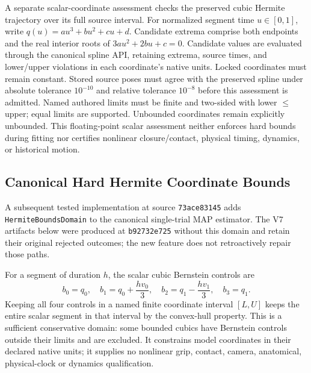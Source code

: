 \documentclass[11pt,letterpaper]{article}
\newcommand{\code}[1]{\nolinkurl{#1}}
\begin{document}
A separate scalar-coordinate assessment checks the preserved cubic Hermite
trajectory over its full source interval. For normalized segment time
$u\in[0,1]$, write $q(u)=a u^3+b u^2+c u+d$. Candidate extrema comprise both
endpoints and the real interior roots of $3a u^2+2b u+c=0$. Candidate values
are evaluated through the canonical spline API, retaining extrema, source
times, and lower/upper violations in each coordinate's native units. Locked
coordinates must remain constant. Stored source poses must agree with the
preserved spline under absolute tolerance $10^{-10}$ and relative tolerance
$10^{-8}$ before this assessment is admitted. Named authored limits must be
finite and two-sided with lower $\leq$ upper; equal limits are supported.
Unbounded coordinates remain explicitly unbounded. This floating-point scalar
assessment neither enforces hard bounds during fitting nor certifies nonlinear
closure/contact, physical timing, dynamics, or historical motion.

\subsection{Canonical Hard Hermite Coordinate Bounds}
A subsequent tested implementation at source \code{73ace83145} adds
\code{HermiteBoundsDomain} to the canonical single-trial MAP estimator. The V7 artifacts below
were produced at \code{b92732e725} without this domain and retain their original
rejected outcomes; the new feature does not retroactively repair those paths.

For a segment of duration $h$, the scalar cubic Bernstein controls are
\begin{equation}
 b_0=q_0,\quad b_1=q_0+\frac{h v_0}{3},\quad
 b_2=q_1-\frac{h v_1}{3},\quad b_3=q_1.
\end{equation}
Keeping all four controls in a named finite coordinate interval $[L,U]$
keeps the entire scalar segment in that interval by the convex-hull property.
This is a sufficient conservative domain: some bounded cubics have Bernstein
controls outside their limits and are excluded. It constrains model
coordinates in their declared native units; it supplies no nonlinear grip,
contact, camera, anatomical, physical-clock or dynamics qualification.
\end{document}
